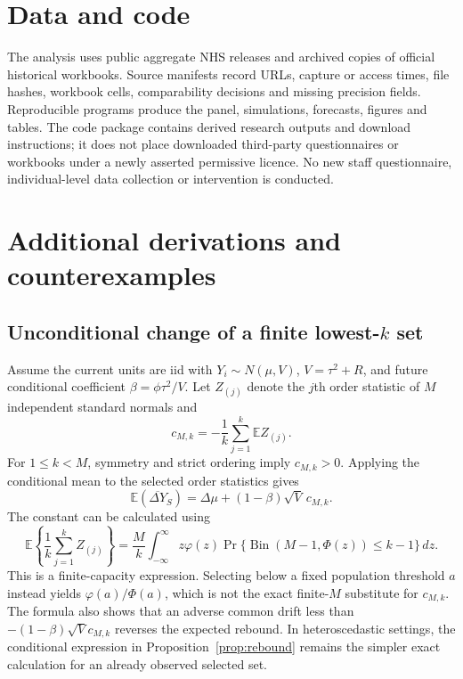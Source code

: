 \documentclass[11pt,letterpaper]{article}
\newcommand{\E}{\mathbb E}
\begin{document}
\section*{Data and code}
The analysis uses public aggregate NHS releases and archived copies of official historical workbooks. Source manifests record URLs, capture or access times, file hashes, workbook cells, comparability decisions and missing precision fields. Reproducible programs produce the panel, simulations, forecasts, figures and tables. The code package contains derived research outputs and download instructions; it does not place downloaded third-party questionnaires or workbooks under a newly asserted permissive licence. No new staff questionnaire, individual-level data collection or intervention is conducted.

\FloatBarrier
\begingroup\small\raggedright
{}
\setlength{\bibsep}{4pt}


\endgroup

\appendix
\section{Additional derivations and counterexamples}\label{app:proofs}
\subsection{Unconditional change of a finite \texorpdfstring{lowest-$k$}{lowest-k} set}
Assume the current units are iid with $Y_i\sim N(\mu,V)$, $V=\tau^2+R$, and future conditional coefficient $\beta=\phi\tau^2/V$. Let $Z_{(j)}$ denote the $j$th order statistic of $M$ independent standard normals and
\[
 c_{M,k}=-\frac1k\sum_{j=1}^k\E Z_{(j)}.
\]
For $1\le k<M$, symmetry and strict ordering imply $c_{M,k}>0$. Applying the conditional mean to the selected order statistics gives
\begin{equation}
 \E(\overline{\Delta Y}_S)=\Delta\mu+(1-\beta)\sqrt V\,c_{M,k}.
 \label{eq:unconditional}
\end{equation}
The constant can be calculated using
\[
 \E\left\{\frac1k\sum_{j=1}^k Z_{(j)}\right\}
 =\frac Mk\int_{-\infty}^{\infty}z\varphi(z)
    \Pr\{\operatorname{Bin}(M-1,\Phi(z))\le k-1\}\,dz.
\]
This is a finite-capacity expression. Selecting below a fixed population threshold $a$ instead yields $\varphi(a)/\Phi(a)$, which is not the exact finite-$M$ substitute for $c_{M,k}$. The formula also shows that an adverse common drift less than $-(1-\beta)\sqrt Vc_{M,k}$ reverses the expected rebound. In heteroscedastic settings, the conditional expression in Proposition~\ref{prop:rebound} remains the simpler exact calculation for an already observed selected set.
\end{document}
